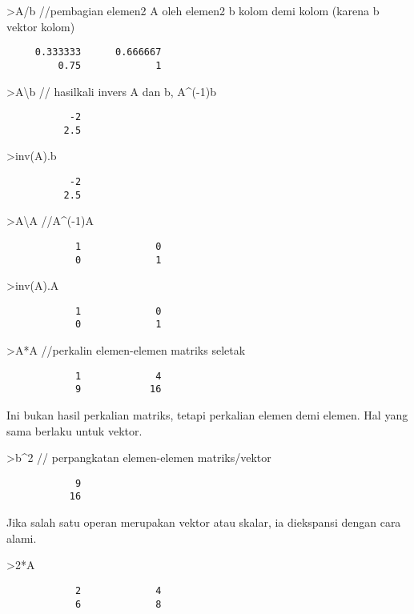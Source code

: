 \documentclass[
]{book}
\begin{document}
\textgreater A/b //pembagian elemen2 A oleh elemen2 b kolom demi kolom (karena b vektor kolom)

\begin{verbatim}
     0.333333      0.666667 
         0.75             1 
\end{verbatim}

\textgreater A\textbackslash b // hasilkali invers A dan b, A\^{}(-1)b

\begin{verbatim}
           -2 
          2.5 
\end{verbatim}

\textgreater inv(A).b

\begin{verbatim}
           -2 
          2.5 
\end{verbatim}

\textgreater A\textbackslash A //A\^{}(-1)A

\begin{verbatim}
            1             0 
            0             1 
\end{verbatim}

\textgreater inv(A).A

\begin{verbatim}
            1             0 
            0             1 
\end{verbatim}

\textgreater A*A //perkalin elemen-elemen matriks seletak

\begin{verbatim}
            1             4 
            9            16 
\end{verbatim}

Ini bukan hasil perkalian matriks, tetapi perkalian elemen demi elemen. Hal yang sama berlaku untuk vektor.

\textgreater b\^{}2 // perpangkatan elemen-elemen matriks/vektor

\begin{verbatim}
            9 
           16 
\end{verbatim}

Jika salah satu operan merupakan vektor atau skalar, ia diekspansi dengan cara alami.

\textgreater2*A

\begin{verbatim}
            2             4 
            6             8 
\end{verbatim}
\end{document}
